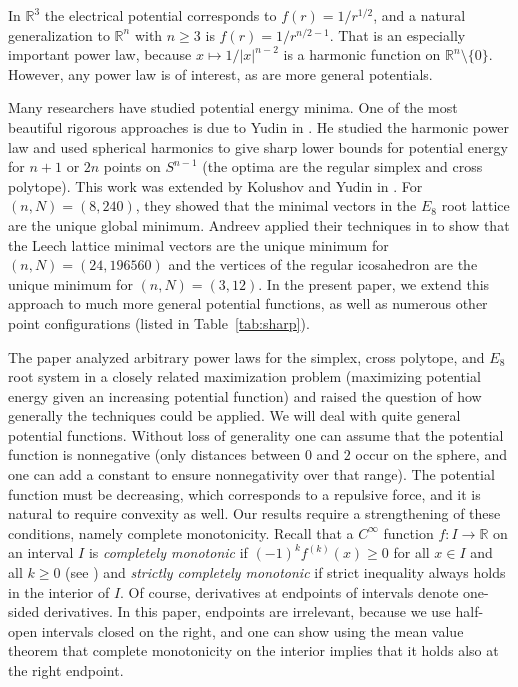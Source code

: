 \documentclass{jams-l}
\theoremstyle{plain}
\numberwithin{theorem}{section}
\theoremstyle{definition}
\numberwithin{equation}{section}
\newcommand{\R}{{\mathbb R}}
\newcommand{\co}{\colon}
\begin{document}
In $\R^3$ the electrical potential corresponds to
$f(r)=1/r^{1/2}$, and a natural generalization to $\R^n$ with
$n\ge3$ is $f(r) = 1/r^{n/2-1}$.  That is an especially important
power law, because $x \mapsto 1/|x|^{n-2}$ is a harmonic function
on $\R^n\setminus\{0\}$. However, any power law is of interest, as
are more general potentials.

Many researchers have studied potential energy minima. One of the
most beautiful rigorous approaches is due to Yudin in \cite{Y}. He
studied the harmonic power law and used spherical harmonics to
give sharp lower bounds for potential energy for $n+1$ or $2n$
points on $S^{n-1}$ (the optima are the regular simplex and cross
polytope).  This work was extended by Kolushov and Yudin in
\cite{KY1}. For $(n,N)=(8,240)$, they showed that the minimal
vectors in the $E_8$ root lattice are the unique global minimum.
Andreev applied their techniques in \cite{A2,A1} to show that the
Leech lattice minimal vectors are the unique minimum for
$(n,N)=(24,196560)$ and the vertices of the regular icosahedron
are the unique minimum for $(n,N)=(3,12)$.  In the present paper,
we extend this approach to much more general potential functions,
as well as numerous other point configurations (listed in
Table~\ref{tab:sharp}).

The paper \cite{KY2} analyzed arbitrary power laws for the
simplex, cross polytope, and $E_8$ root system in a closely
related maximization problem (maximizing potential energy given an
increasing potential function) and raised the question of how
generally the techniques could be applied.  We will deal with
quite general potential functions. Without loss of generality one
can assume that the potential function is nonnegative (only
distances between $0$ and $2$ occur on the sphere, and one can add
a constant to ensure nonnegativity over that range).  The
potential function must be decreasing, which corresponds to a
repulsive force, and it is natural to require convexity as well.
Our results require a strengthening of these conditions, namely
complete monotonicity. Recall that a $C^\infty$ function $f \co I
\to \R$ on an interval $I$ is \textit{completely monotonic\/} if
$(-1)^k f^{(k)}(x) \ge 0$ for all $x \in I$ and all $k \ge 0$ (see
\cite[p.~145]{W}) and \textit{strictly completely monotonic} if
strict inequality always holds in the interior of $I$. Of course,
derivatives at endpoints of intervals denote one-sided
derivatives.  In this paper, endpoints are irrelevant, because we
use half-open intervals closed on the right, and one can show
using the mean value theorem that complete monotonicity on the
interior implies that it holds also at the right endpoint.
\end{document}
